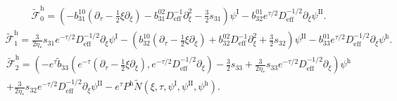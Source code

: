 \documentclass[11pt]{article}
\numberwithin{equation}{section}
\numberwithin{prop}{section}
\newcommand{\psih}{\psi^\mathrm{h}}
\newcommand{\Deff}{D_\mathrm{eff}}
\newcommand{\tfh}{\tilde{\mathcal{F}}^\mathrm{h}}
\newcommand{\psiI}{\psi^\mathrm{I}}
\newcommand{\psiII}{\psi^\mathrm{II}}
\newcommand{\Ph}{P^\mathrm{h}}
\begin{document}
\begin{align}
\tfh_0 = \left(-b_{31}^{10} (\partial_\tau - \frac{1}{2} \xi \partial_\xi ) - b_{31}^{02} \Deff^{-1} \partial_\xi^2 - \frac{3}{2} s_{31} \right) \psiI - b_{32}^{01} e^{\tau/2} \Deff^{-1/2} \partial_\xi \psiII. \label{e: tilde F h 0 expression}
\end{align}
\begin{multline}
\tfh_1 = \frac{3}{2 \eta_*} s_{31} e^{-\tau/2} \Deff^{-1/2} \partial_\xi \psiI - \left(  b_{32}^{10} (\partial_\tau - \frac{1}{2} \xi \partial_\xi) + b_{32}^{02} \Deff^{-1} \partial_\xi^2 + \frac{3}{2} s_{32} \right) \psiII - b_{33}^{01} e^{\tau/2}  \Deff^{-1/2} \partial_\xi \psih. \label{e: tfh 1 expression}
\end{multline}
\begin{multline}
\tfh_2 =  \left( - e^\tau \tilde{b}_{33} \left( e^{-\tau} (\partial_\tau - \frac{1}{2} \xi \partial_\xi), e^{-\tau/2} \Deff^{-1/2} \partial_\xi \right) - \frac{3}{2} s_{33} + \frac{3}{2 \eta_*} s_{33} e^{-\tau/2} \Deff^{-1/2} \partial_\xi \right) \psih \\ +  \frac{3}{2 \eta_*} s_{32} e^{-\tau/2} \Deff^{-1/2} \partial_\xi  \psiII - e^\tau \Ph \tilde{N}(\xi, \tau, \psiI, \psiII, \psih). 
\end{multline}
\end{document}
